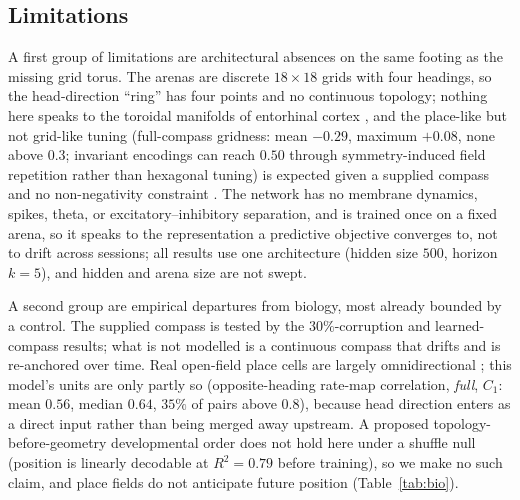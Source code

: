 \subsection*{Limitations}

A first group of limitations are architectural absences on the same footing as the missing grid torus.
The arenas are discrete $18\times18$ grids with four headings, so the head-direction ``ring'' has four
points and no continuous topology; nothing here speaks to the toroidal manifolds of entorhinal cortex
\citep{gardner2022toroidal}, and the place-like but not grid-like tuning (full-compass gridness: mean
$-0.29$, maximum $+0.08$, none above $0.3$; invariant encodings can reach $0.50$ through
symmetry-induced field repetition rather than hexagonal tuning) is expected given a supplied compass and
no non-negativity constraint \citep{sorscher2023unified}. The network has no membrane dynamics, spikes,
theta, or excitatory--inhibitory separation, and is trained once on a fixed arena, so it speaks to the
representation a predictive objective converges to, not to drift across sessions; all results use one
architecture (hidden size $500$, horizon $k=5$), and hidden and arena size are not swept.

A second group are empirical departures from biology, most already bounded by a control. The supplied
compass is tested by the $30\%$-corruption and learned-compass results; what is not modelled is a
continuous compass that drifts and is re-anchored over time. Real open-field place cells are largely
omnidirectional \citep{mcnaughton1983, markus1995}; this model's units are only partly so
(opposite-heading rate-map correlation, \textit{full}, $C_1$: mean $0.56$, median $0.64$, $35\%$ of
pairs above $0.8$), because head direction enters as a direct input rather than being merged away
upstream. A proposed topology-before-geometry developmental order does not hold here under a shuffle null
(position is linearly decodable at $R^2 = 0.79$ before training), so we make no such claim, and place
fields do not anticipate future position (Table~\ref{tab:bio}).

